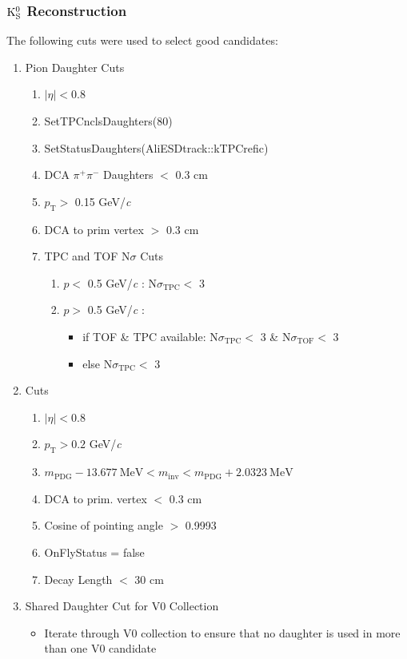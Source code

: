 \documentclass[../AnalysisNoteJBuxton.tex]{subfiles}
\begin{document}
\subsubsection{\texorpdfstring{$\rm K^{0}_{S}$}{TEXT} Reconstruction}
\label{K0sReconstruction}

The following cuts were used to select good \Ks candidates:

\begin{enumerate}
 \item{Pion Daughter Cuts}
 \begin{enumerate}
  \item $|\eta| < 0.8$
  \item SetTPCnclsDaughters(80)
  \item SetStatusDaughters(AliESDtrack::kTPCrefic)
  \item DCA $\pi^{+}\pi^{-}$ Daughters $<$ 0.3 cm
  \item $p_{\mathrm{T}} >$ 0.15 GeV/\textit{c}
  \item DCA to prim vertex $>$ 0.3 cm
   \item TPC and TOF N$\sigma$ Cuts
   \begin{enumerate}
    \item $p <$ 0.5 GeV/\textit{c} : N$\sigma_{\mathrm{TPC}} <$ 3
    \item $p >$ 0.5 GeV/\textit{c} :
    \begin{itemize}
     \item if TOF \& TPC available: N$\sigma_{\mathrm{TPC}} <$ 3 \& N$\sigma_{\mathrm{TOF}} <$ 3
     \item else N$\sigma_{\mathrm{TPC}} <$ 3
    \end{itemize}
   \end{enumerate}  
 \end{enumerate}

 \item \Ks Cuts
 \begin{enumerate}
  \item $|\eta| < 0.8$
  \item $p_{\mathrm{T}} > 0.2$ GeV/\textit{c}
  \item $m_{\mathrm{PDG}}-13.677 \ \mathrm{MeV} < m_{\mathrm{inv}} < m_{\mathrm{PDG}} + 2.0323 \ \mathrm{MeV}$
  \item DCA to prim. vertex $<$ 0.3 cm
  \item Cosine of pointing angle $>$ 0.9993
  \item OnFlyStatus = false
  \item Decay Length $<$ 30 cm
 \end{enumerate}  
 \item Shared Daughter Cut for V0 Collection
 \begin{itemize}
  \item Iterate through V0 collection to ensure that no daughter is used in more than one V0 candidate
 \end{itemize} 
\end{enumerate}
\end{document}
